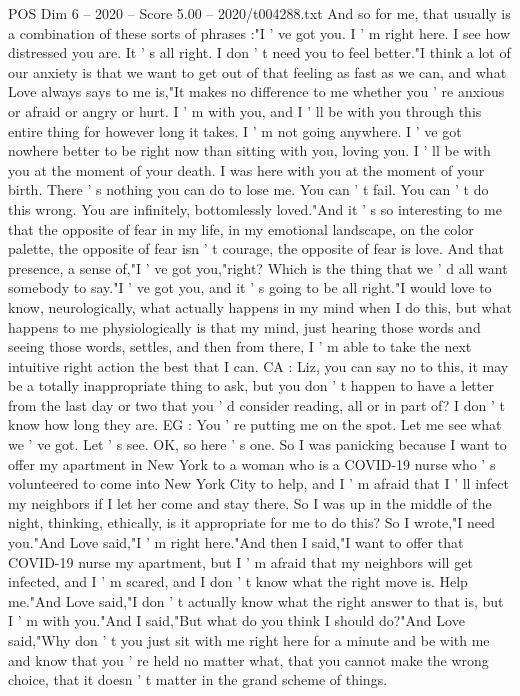 \begin{textsample}{POS Dim 6 – 2020 – Score 5.00 – 2020/t004288.txt}
And so for me, that usually is a combination of these sorts of phrases :"I ' ve got you.
I ' m right here.
I see how distressed you are.
It ' s all right.
I don ' t need you to feel better."I think a lot of our anxiety is that we want to get out of that feeling as fast as we can, and what Love always says to me is,"It makes no difference to me whether you ' re anxious or afraid or angry or hurt.
I ' m with you, and I ' ll be with you through this entire thing for however long it takes.
I ' m not going anywhere.
I ' ve got nowhere better to be right now than sitting with you, loving you.
I ' ll be with you at the moment of your death.
I was here with you at the moment of your birth.
There ' s nothing you can do to lose me.
You can ' t fail.
You can ' t do this wrong.
You are infinitely, bottomlessly loved."And it ' s so interesting to me that the opposite of fear in my life, in my emotional landscape, on the color palette, the opposite of fear isn ' t courage, the opposite of fear is love.
And that presence, a sense of,"I ' ve got you,"right?
Which is the thing that we ' d all want somebody to say."I ' ve got you, and it ' s going to be all right."I would love to know, neurologically, what actually happens in my mind when I do this, but what happens to me physiologically is that my mind, just hearing those words and seeing those words, settles, and then from there, I ' m able to take the next intuitive right action the best that I can.
CA : Liz, you can say no to this, it may be a totally inappropriate thing to ask, but you don ' t happen to have a letter from the last day or two that you ' d consider reading, all or in part of?
I don ' t know how long they are.
EG : You ' re putting me on the spot.
Let me see what we ' ve got.
Let ' s see.
OK, so here ' s one.
So I was panicking because I want to offer my apartment in New York to a woman who is a COVID-19 nurse who ' s volunteered to come into New York City to help, and I ' m afraid that I ' ll infect my neighbors if I let her come and stay there.
So I was up in the middle of the night, thinking, ethically, is it appropriate for me to do this?
So I wrote,"I need you."And Love said,"I ' m right here."And then I said,"I want to offer that COVID-19 nurse my apartment, but I ' m afraid that my neighbors will get infected, and I ' m scared, and I don ' t know what the right move is.
Help me."And Love said,"I don ' t actually know what the right answer to that is, but I ' m with you."And I said,"But what do you think I should do?"And Love said,"Why don ' t you just sit with me right here for a minute and be with me and know that you ' re held no matter what, that you cannot make the wrong choice, that it doesn ' t matter in the grand scheme of things.

\end{textsample}
